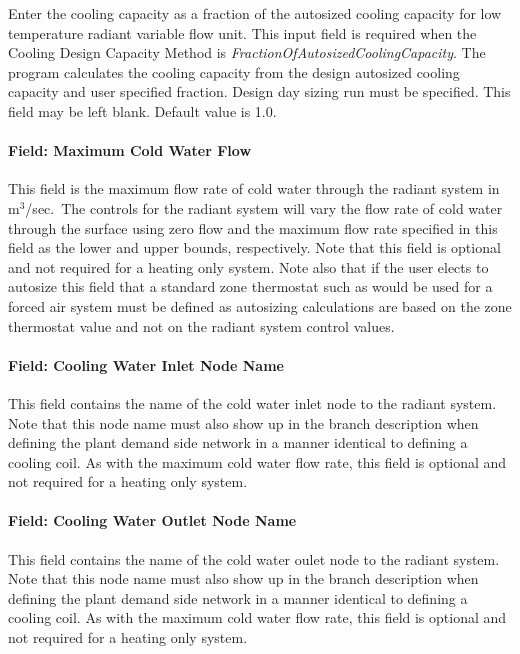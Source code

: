 Enter the cooling capacity as a fraction of the autosized cooling capacity for low temperature radiant variable flow unit. This input field is required when the Cooling Design Capacity Method is \emph{FractionOfAutosizedCoolingCapacity}. The program calculates the cooling capacity from the design autosized cooling capacity and user specified fraction. Design day sizing run must be specified. This field may be left blank. Default value is 1.0.

\paragraph{Field: Maximum Cold Water Flow}\label{field-maximum-cold-water-flow}

This field is the maximum flow rate of cold water through the radiant system in m\(^{3}\)/sec.~The controls for the radiant system will vary the flow rate of cold water through the surface using zero flow and the maximum flow rate specified in this field as the lower and upper bounds, respectively. Note that this field is optional and not required for a heating only system. Note also that if the user elects to autosize this field that a standard zone thermostat such as would be used for a forced air system must be defined as autosizing calculations are based on the zone thermostat value and not on the radiant system control values.

\paragraph{Field: Cooling Water Inlet Node Name}\label{field-cooling-water-inlet-node-name-000}

This field contains the name of the cold water inlet node to the radiant system. Note that this node name must also show up in the branch description when defining the plant demand side network in a manner identical to defining a cooling coil. As with the maximum cold water flow rate, this field is optional and not required for a heating only system.

\paragraph{Field: Cooling Water Outlet Node Name}\label{field-cooling-water-outlet-node-name-000}

This field contains the name of the cold water oulet node to the radiant system. Note that this node name must also show up in the branch description when defining the plant demand side network in a manner identical to defining a cooling coil. As with the maximum cold water flow rate, this field is optional and not required for a heating only system.

